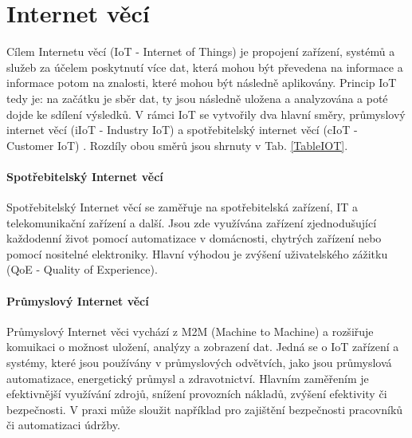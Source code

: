 \chapter{Internet věcí}

Cílem Internetu věcí (IoT - Internet of Things) je propojení zařízení, systémů a služeb za účelem poskytnutí více dat, která mohou být převedena na informace a informace potom na znalosti, které mohou být následně aplikovány. Princip IoT tedy je: na začátku je sběr dat, ty jsou následně uložena a analyzována a poté dojde ke sdílení výsledků. V rámci IoT se vytvořily dva hlavní směry, průmyslový internet věcí (iIoT - Industry IoT) a spotřebitelský internet věcí (cIoT - Customer IoT) \cite{iot_svet_hardware_internet_veci, uvod_pohanka_internet_veci}. Rozdíly obou směrů jsou shrnuty v Tab. \ref{TableIOT}.

\subsubsection{Spotřebitelský Internet věcí}
Spotřebitelský Internet věcí se zaměřuje na spotřebitelská zařízení, IT a telekomunikační zařízení a další. Jsou zde využívána zařízení zjednodušující každodenní život pomocí automatizace v domácnosti, chytrých zařízení nebo pomocí nositelné elektroniky. Hlavní výhodou je zvýšení uživatelského zážitku (QoE - Quality of Experience).

\subsubsection{Průmyslový Internet věcí}
Průmyslový Internet věci vychází z M2M (Machine to Machine) a rozšiřuje komuikaci o možnost uložení, analýzy a zobrazení dat. Jedná se o IoT zařízení a systémy, které jsou používány v průmyslových odvětvích, jako jsou průmyslová automatizace, energetický průmysl a zdravotnictví. Hlavním zaměřením je efektivnější využívání zdrojů, snížení provozních nákladů, zvýšení efektivity či bezpečnosti. V praxi může sloužit například pro zajištění bezpečnosti pracovníků či automatizaci údržby. 



